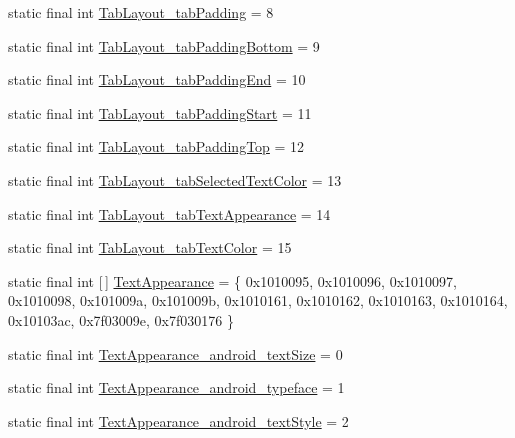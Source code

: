 \begin{DoxyCompactItemize}
\item 
static final int \mbox{\hyperlink{classandroid_1_1support_1_1design_1_1_r_1_1styleable_a056f2b88be834bf619bf77c735cf5a42}{Tab\+Layout\+\_\+tab\+Padding}} = 8
\item 
static final int \mbox{\hyperlink{classandroid_1_1support_1_1design_1_1_r_1_1styleable_ad4991690d110e7f1385ee3f9d1a5b85b}{Tab\+Layout\+\_\+tab\+Padding\+Bottom}} = 9
\item 
static final int \mbox{\hyperlink{classandroid_1_1support_1_1design_1_1_r_1_1styleable_adbeb0bd64f8e4ad9368fe2a1b099b617}{Tab\+Layout\+\_\+tab\+Padding\+End}} = 10
\item 
static final int \mbox{\hyperlink{classandroid_1_1support_1_1design_1_1_r_1_1styleable_a0d9cc14d7d2c3237d4b22dd1fae200ba}{Tab\+Layout\+\_\+tab\+Padding\+Start}} = 11
\item 
static final int \mbox{\hyperlink{classandroid_1_1support_1_1design_1_1_r_1_1styleable_a703b4a603e37f5394dd946d44278424c}{Tab\+Layout\+\_\+tab\+Padding\+Top}} = 12
\item 
static final int \mbox{\hyperlink{classandroid_1_1support_1_1design_1_1_r_1_1styleable_ae1d2a6b701002c2b0ac537ba670c9494}{Tab\+Layout\+\_\+tab\+Selected\+Text\+Color}} = 13
\item 
static final int \mbox{\hyperlink{classandroid_1_1support_1_1design_1_1_r_1_1styleable_a2b960a4f2c5c0cd6831652cc2cf9844d}{Tab\+Layout\+\_\+tab\+Text\+Appearance}} = 14
\item 
static final int \mbox{\hyperlink{classandroid_1_1support_1_1design_1_1_r_1_1styleable_a5dee3b9d7a0f68858b1fd00fe184d831}{Tab\+Layout\+\_\+tab\+Text\+Color}} = 15
\item 
static final int \mbox{[}$\,$\mbox{]} \mbox{\hyperlink{classandroid_1_1support_1_1design_1_1_r_1_1styleable_a23dc46ec989f92f528b46568dad7e726}{Text\+Appearance}} = \{ 0x1010095, 0x1010096, 0x1010097, 0x1010098, 0x101009a, 0x101009b, 0x1010161, 0x1010162, 0x1010163, 0x1010164, 0x10103ac, 0x7f03009e, 0x7f030176 \}
\item 
static final int \mbox{\hyperlink{classandroid_1_1support_1_1design_1_1_r_1_1styleable_a4ca078b59bd3cea0f1cc46eb1ba33efa}{Text\+Appearance\+\_\+android\+\_\+text\+Size}} = 0
\item 
static final int \mbox{\hyperlink{classandroid_1_1support_1_1design_1_1_r_1_1styleable_aa5911a5763e1b03e8ea594230ad9f1a5}{Text\+Appearance\+\_\+android\+\_\+typeface}} = 1
\item 
static final int \mbox{\hyperlink{classandroid_1_1support_1_1design_1_1_r_1_1styleable_afdc1e2a3b8c14b12194550bf78f9b051}{Text\+Appearance\+\_\+android\+\_\+text\+Style}} = 2

\end{DoxyCompactItemize}
